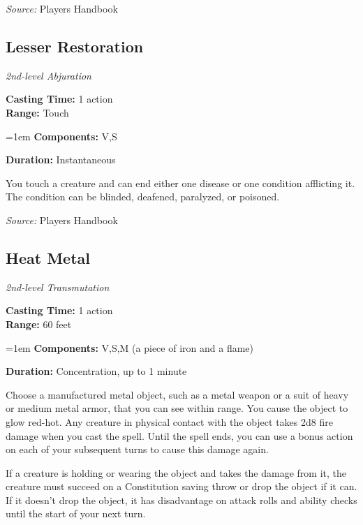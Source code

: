 \documentclass[10pt,twoside,twocolumn]{article}
\begin{document}
\textit{Source:} Players Handbook

\subsection{Lesser Restoration}
\textit{2nd-level Abjuration}
\smallskip

\noindent
\textbf{Casting Time:}  1 action\\
\textbf{Range:}  Touch

\noindent
\hangindent=1em
\textbf{Components:}  V,S

\noindent
\textbf{Duration:}  Instantaneous\\
\smallskip



You touch a creature and can end either one disease or one condition afflicting it. The condition can be blinded, deafened, paralyzed, or poisoned.



\textit{Source:} Players Handbook

\subsection{Heat Metal}
\textit{2nd-level Transmutation}
\smallskip

\noindent
\textbf{Casting Time:}  1 action\\
\textbf{Range:}  60 feet

\noindent
\hangindent=1em
\textbf{Components:}  V,S,M (a piece of iron and a flame)

\noindent
\textbf{Duration:}  Concentration, up to 1 minute\\
\smallskip



Choose a manufactured metal object, such as a metal weapon or a suit of heavy or medium metal armor, that you can see within range. You cause the object to glow red-hot. Any creature in physical contact with the object takes 2d8 fire damage when you cast the spell. Until the spell ends, you can use a bonus action on each of your subsequent turns to cause this damage again.

If a creature is holding or wearing the object and takes the damage from it, the creature must succeed on a Constitution saving throw or drop the object if it can. If it doesn't drop the object, it has disadvantage on attack rolls and ability checks until the start of your next turn.
\end{document}
